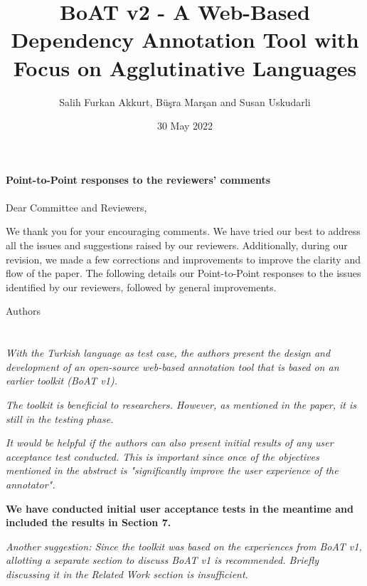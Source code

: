 \documentclass[final,2p]{article}
\newcommand{\comment}{\emph}
\newcommand{\response}{\noindent \textbf}
\begin{document}
%
\title{BoAT v2 - A Web-Based Dependency Annotation Tool with Focus on Agglutinative Languages}%
\author{Salih Furkan Akkurt, Büşra Marşan and Susan Uskudarli}
\date{30 May 2022}

\maketitle

\textbf{Point-to-Point responses to the reviewers' comments}\\\\


Dear Committee and Reviewers,

We thank you for your encouraging comments. 
We have tried our best to address all the issues and suggestions raised by our reviewers. 
Additionally, during our revision, we made a few corrections and improvements to improve the clarity and flow of the paper. 
The following details our Point-to-Point responses to the issues identified by our reviewers, followed by general improvements.

Authors

\section*{}

\comment{With the Turkish language as test case, the authors present the design and development of an open-source web-based annotation tool that is based on an earlier toolkit (BoAT v1).}

\comment{The toolkit is beneficial to researchers. However, as mentioned in the paper, it is still in the testing phase.}

\comment{It would be helpful if the authors can also present initial results of any user acceptance test conducted. This is important since once of the objectives mentioned in the abstract is "significantly improve the user experience of the annotator".}

\response{We have conducted initial user acceptance tests in the meantime and included the results in Section 7.}

\comment{Another suggestion: Since the toolkit was based on the experiences from BoAT v1, allotting a separate section to discuss BoAT v1 is recommended. Briefly discussing it in the Related Work section is insufficient.}
\end{document}
